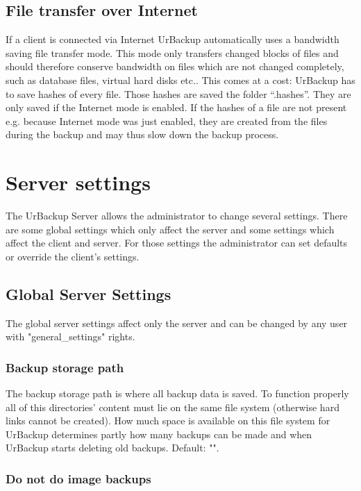 \documentclass[a4paper,10pt]{article}
\begin{document}
\subsection{File transfer over Internet}

If a client is connected via Internet UrBackup automatically uses a bandwidth saving
file transfer mode. This mode only transfers changed blocks of files and should 
therefore conserve bandwidth on files which are not changed completely, such as
database files, virtual hard disks etc.. This comes at a cost: UrBackup has to save
hashes of every file. Those hashes are saved the folder ``.hashes''. They are only
saved if the Internet mode is enabled. If the hashes of a file are not present e.g.
because Internet mode was just enabled, they are created from the files during
the backup and may thus slow down the backup process. 

\section{Server settings}
\label{server_settings}

The UrBackup Server allows the administrator to change several settings. There
are some global settings which only affect the server and some settings which
affect the client and server. For those settings the administrator can set
defaults or override the client's settings.

\subsection{Global Server Settings}

The global server settings affect only the server and can be changed by any user
with "general\_settings" rights.

\subsubsection{Backup storage path}

The backup storage path is where all backup data is saved. To function properly all of this directories' content must lie on the same file system (otherwise hard links cannot be created). How much space is available on this file system for UrBackup determines partly how many backups can be made and when UrBackup starts deleting old backups. Default: "".

\subsubsection{Do not do image backups}
\end{document}
